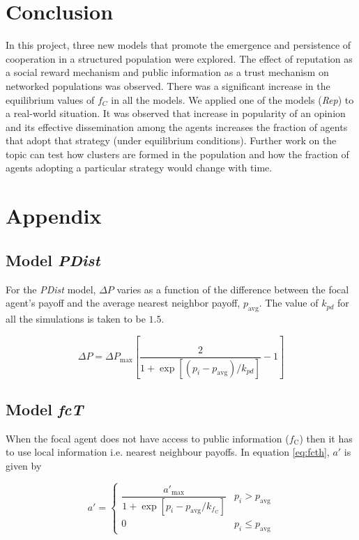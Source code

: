 \documentclass[11pt, A4 paper, twocolumn ]{article}
\newcommand{\fc}{$ f_{\text{C}} $}
\newcommand{\fcm}{f_{\text{C}}}
\begin{document}
 \section{Conclusion} \label{sec:conclusion}
 In this project, three new models that promote the emergence and persistence of cooperation in a structured population were explored. The effect of reputation as a social reward mechanism and public information as a trust mechanism on networked populations was observed. There was a significant increase in the equilibrium values of $ f_{C} $ in all the models. We applied one of the models (\textit{Rep}) to a real-world situation. It was observed that increase in popularity of an opinion and its effective dissemination among the agents increases the fraction of agents that adopt that strategy (under equilibrium conditions). Further work on the topic can test how clusters are formed in the population and how the fraction of agents adopting a particular strategy would change with time. 
 
 
\appendix
 \section{Appendix} \label{appendix}
 \subsection{Model \textit{PDist}} \label{app:1}
 For the \textit{PDist} model, $ \Delta P$ varies as a function of the difference between the focal agent's payoff and the average nearest neighbor payoff, $p_\text{avg}$. The value of $ k_{pd} $ for all the simulations is taken to be $ 1.5 $.
 
 \begin{equation}\label{eq:deltap}
 	\Delta P = \Delta P_\text{max} \left[\frac{2}{1 + \exp[(p_{i} - p_{\text{avg}})/k_{pd}]} - 1\right]
 \end{equation}
 
 \subsection{Model \textit{fcT}}\label{app:2}
 When the focal agent does not have access to public information (\fc) then it has to use local information i.e. nearest neighbour payoffs. In equation \ref{eq:fcth}, $ a' $ is given by
 
 \begin{equation}
 	a' = 
 	\begin{cases}
 		\dfrac{a'_{\text{max}}}{1 + \exp[p_{i} - p_{\text{avg}}/k_{\fcm}]} & p_{i}>p_{\text{avg}} \\
 		0 & p_{i}\leq p_{\text{avg}}
 	\end{cases}
 \end{equation}
\end{document}
